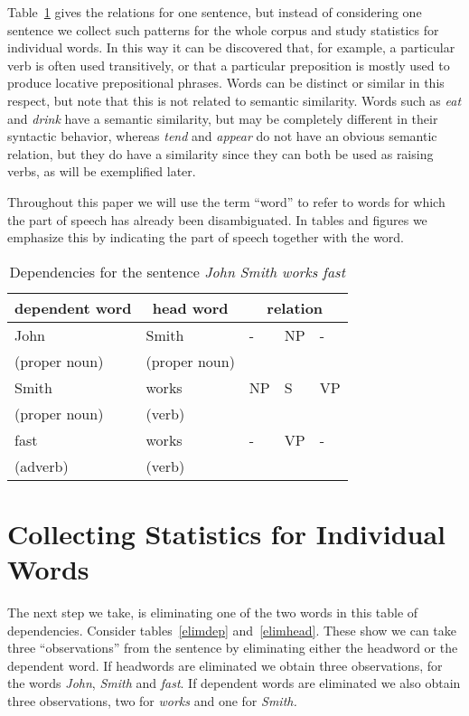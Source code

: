 Table~\ref{examp} gives the relations for one sentence, but instead of
considering one sentence we collect such patterns for the whole corpus and study
statistics for individual words. In this way it can be discovered that, for
example, a particular verb is often used transitively, or that a particular
preposition is mostly used to produce locative prepositional phrases. Words can
be distinct or similar in this respect, but note that this is not related to
semantic similarity.  Words such as {\em eat} and {\em drink} have a semantic
similarity, but may be completely different in their syntactic behavior, whereas
{\em tend} and {\em appear} do not have an obvious semantic relation, but they
do have a similarity since they can both be used as raising verbs, as will be
exemplified later.

Throughout this paper we will use the term ``word'' to refer to words
for which the part of speech has already been disambiguated. In tables
and figures we emphasize this by indicating the part of speech
together with the word.

\begin{table}[thbc]
\begin{center}
\caption{Dependencies for the sentence {\em John Smith works fast}}
\begin{tabular}{|l|l|lll|} \hline
\multicolumn{1}{|c|}{dependent word} & 
       \multicolumn{1}{|c|}{head word} & 
       \multicolumn{3}{|c|}{relation} \\ \hline
John & Smith &  - & NP & - \\ 
(proper noun) & (proper noun) & & & \\  \hline
Smith & works & NP & S & VP \\ 
(proper noun) & (verb) & & & \\ \hline
fast & works & - & VP & - \\ 
(adverb) & (verb) & & & \\ \hline
\end{tabular}
\label{examp}
\end{center}
\end{table}

\section{Collecting Statistics for Individual Words} \label{statsec}

The next step we take, is eliminating one of the two words in this
table of dependencies. Consider tables~\ref{elimdep}
and~\ref{elimhead}. These show we can take three ``observations''
from the sentence by eliminating either the headword or the dependent
word. If headwords are eliminated we obtain three observations, for
the words {\em John}, {\em Smith} and {\em fast}. If dependent words are
eliminated we also obtain three observations, two for {\em works} and
one for {\em Smith.}

